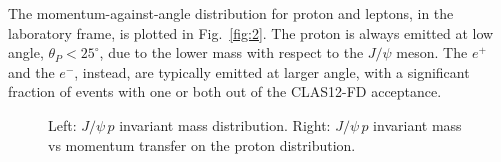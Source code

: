 \documentclass[a4paper,10pt]{article}
\begin{document}
The momentum-against-angle distribution for proton and leptons, in the laboratory frame, is plotted in Fig.~\ref{fig:2}. The proton is always emitted at low angle, $\theta_P < 25^{\circ}$, due to the lower mass with respect to the $J/\psi$ meson. The $e^{+}$ and the $e^{-}$, instead, are typically emitted at larger angle, with a significant fraction of events with one or both out of the CLAS12-FD acceptance.
\begin{figure}[tpb]
\caption{\footnotesize \label{fig:1} Left: $J/\psi \, p$ invariant mass distribution. Right: $J/\psi \, p$ invariant mass vs momentum transfer on the proton distribution.}
\end{figure}
\end{document}
